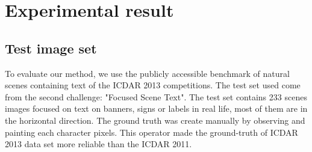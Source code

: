 
\graphicspath{ {6chapterExperimental/image/} }
\chapter{Experimental result}
\section{Test image set} \label{test_set}
To evaluate our method, we use the publicly accessible benchmark of natural scenes containing text of the ICDAR 2013 competitions. The test set used come from the second challenge: "Focused Scene Text". The test set contains 233 scenes images focused on text on banners, signs or labels in real life, most of them are in the horizontal direction. The ground truth was create manually by observing and painting each character pixels. This operator made the ground-truth of ICDAR 2013 data set more reliable than the ICDAR 2011.   
 
